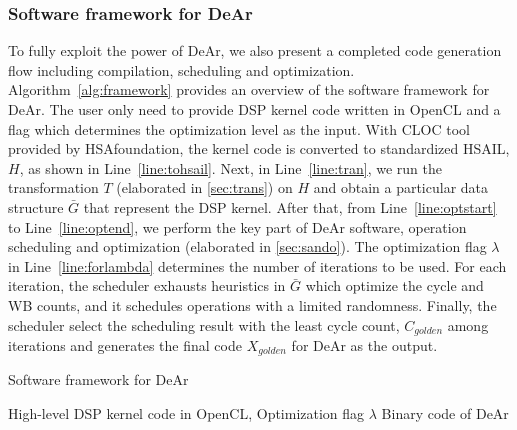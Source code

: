\documentclass[12pt]{article}
\begin{document}
\begin{CJK}{UTF8}{bkai}
        \subsubsection{Software framework for DeAr}
            To fully exploit the power of DeAr, we also present a completed code generation flow including compilation, scheduling and optimization.
            Algorithm~\ref{alg:framework} provides an overview of the software framework for DeAr. 
            The user only need to provide DSP kernel code written in OpenCL and a flag which determines the optimization level as the input.
            With CLOC \cite{cloc} tool provided by HSAfoundation, the kernel code is converted to standardized HSAIL, $H$, as shown in Line~\ref{line:tohsail}.
            Next, in Line~\ref{line:tran}, we run the transformation $T$ (elaborated in \ref{sec:trans}) on $H$ and obtain a particular data structure $\bar{G}$ that represent the DSP kernel.
            After that, from Line~\ref{line:optstart} to Line~\ref{line:optend}, we perform the key part of DeAr software, operation scheduling and optimization (elaborated in \ref{sec:sando}).
            The optimization flag $\lambda$ in Line~\ref{line:forlambda} determines the number of iterations to be used.
            For each iteration, the scheduler exhausts heuristics in $\bar{G}$ which optimize the cycle and WB counts, and it schedules operations with a limited randomness.
            Finally, the scheduler select the scheduling result with the least cycle count, $C_{golden}$ among iterations and generates the final code $X_{golden}$ for DeAr as the output.

            \begin{algorithm}[h]
              \caption{Software framework for DeAr}
              \begin{algorithmic}[1]
                    \Require 
                        High-level DSP kernel code in OpenCL, Optimization flag $\lambda$
                    \Ensure 
                        Binary code of DeAr


\end{algorithmic}
\end{algorithm}
\end{CJK}
\end{document}
